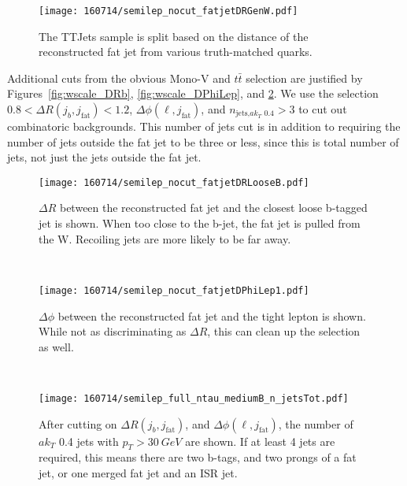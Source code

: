 \documentclass{article}
\begin{document}
\begin{figure}[h]
  \centering
  \texttt{[image: 160714/semilep\_nocut\_fatjetDRGenW.pdf]}
  \caption{The TTJets sample is split based on the distance of the reconstructed fat jet
  from various truth-matched quarks.}
  \label{fig:wscale_DRGen}
\end{figure}

Additional cuts from the obvious Mono-V and $t\bar{t}$ selection are 
justified by Figures~\ref{fig:wscale_DRb}, \ref{fig:wscale_DPhiLep}, and \ref{fig:wscale_njetstot}.
We use the selection $0.8 < \Delta R(j_b,j_\text{fat}) < 1.2$,
$\Delta\phi(\ell,j_\text{fat})$, and
$n_\text{jets,$ak_T$ 0.4} > 3$
to cut out combinatoric backgrounds.
This number of jets cut is in addition to requiring the number of jets outside the fat jet
to be three or less, since this is total number of jets, not just the jets outside
the fat jet.

\begin{figure}[h]
  \centering
  \begin{minipage}{0.49\linewidth}
    \centering
    \texttt{[image: 160714/semilep\_nocut\_fatjetDRLooseB.pdf]}
    \caption{$\Delta R$ between the reconstructed fat jet and the closest loose
    b-tagged jet is shown. When too close to the b-jet, the fat jet is pulled from
    the W. Recoiling jets are more likely to be far away.}
    \label{fig:wscale_DRb}
  \end{minipage}
  ~
  \begin{minipage}{0.49\linewidth}
    \centering
    \texttt{[image: 160714/semilep\_nocut\_fatjetDPhiLep1.pdf]}
    \caption{$\Delta\phi$ between the reconstructed fat jet and the tight lepton
      is shown. While not as discriminating as $\Delta R$, this can clean up the selection
      as well.}
    \label{fig:wscale_DPhiLep}
  \end{minipage}
  ~
  \begin{minipage}{0.49\linewidth}
    \centering
    \texttt{[image: 160714/semilep\_full\_ntau\_mediumB\_n\_jetsTot.pdf]}
    \caption{After cutting on $\Delta R(j_b,j_\text{fat})$, and $\Delta\phi(\ell,j_\text{fat})$,
      the number of $ak_{T}$ 0.4 jets with $p_T > \SI{30}{GeV}$ are shown.
      If at least 4 jets are required, this means there are two b-tags, and two prongs of a
      fat jet, or one merged fat jet and an ISR jet.}
    \label{fig:wscale_njetstot}
  \end{minipage}
\end{figure}
  
\end{document}
